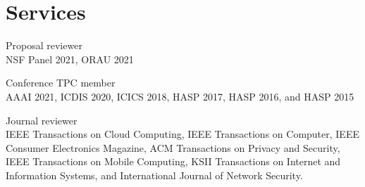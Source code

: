 
\section*{Services}
\begin{compactitem}
    \item Proposal reviewer\\
    NSF Panel 2021, ORAU 2021
    \item Conference TPC member\\
    AAAI 2021, ICDIS 2020, ICICS 2018, HASP 2017, HASP 2016, and HASP 2015
    \item Journal reviewer \\
    IEEE Transactions on Cloud Computing, IEEE Transactions on Computer, IEEE Consumer Electronics Magazine, ACM Transactions on Privacy and Security, IEEE Transactions on Mobile Computing, KSII Transactions on Internet and Information Systems, and International Journal of Network Security.
\end{compactitem}
